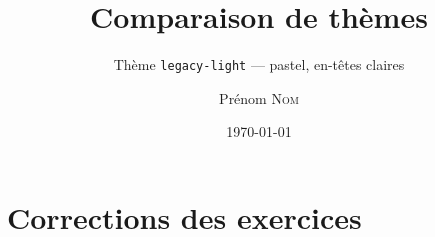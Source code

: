 \documentclass[11pt]{ocots-book}
\title{Comparaison de thèmes}
\subtitle{Thème \texttt{legacy-light} — pastel, en-têtes claires}
\author{Prénom \textsc{Nom}}
\date{\today}
\begin{document}
\maketitle

\ocotscollectsolutions%





\chapter{Corrections des exercices}
\ocotsprintsolutions%



\end{document}
